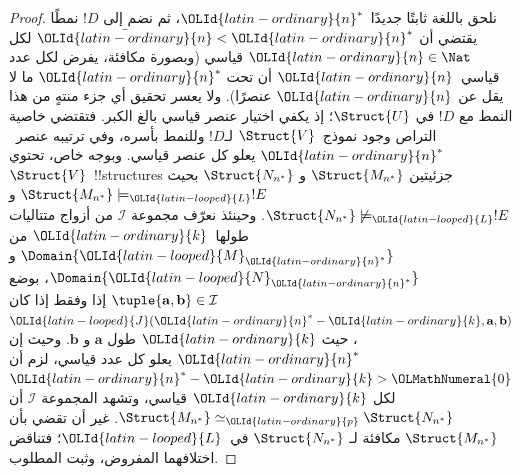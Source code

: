 \documentclass[../../../include/open-logic-section]{subfiles}
\begin{document}
\begin{proof}
نلحق باللغة ثابتًا جديدًا~${\OLId{latin-ordinary}{n}}^*$، ثم نضم إلى $!D$ نمطًا يقتضي أن
$\bar {\OLId{latin-ordinary}{n}} < {\OLId{latin-ordinary}{n}}^*$ لكل ${\OLId{latin-ordinary}{n}} \in \Nat$ قياسي (وبصورة مكافئة، يفرض لكل عدد
قياسي~${\OLId{latin-ordinary}{n}}$ أن تحت ${\OLId{latin-ordinary}{n}}^*$ ما لا يقل عن ${\OLId{latin-ordinary}{n}}$ عنصرًا). ولا يعسر تحقيق أي جزء منتهٍ من هذا
النمط مع $!D$ في $\Struct{U}$؛ إذ يكفي اختيار عنصر قياسي بالغ الكبر.
فتقتضي خاصية التراص وجود نموذج~$\Struct{V}$ لـ$!D$ وللنمط بأسره، وفي
ترتيبه عنصر~${\OLId{latin-ordinary}{n}}^*$ يعلو كل عنصر قياسي. وبوجه خاص، تحتوي
$\Struct{V}$~!!{structure}s جزئيتين $\Struct{M_{n^*}}$ و
$\Struct{N_{n^*}}$ بحيث $\Struct{M_{n^*}} \models_{\OLId{latin-looped}{L}} !E$ و
$\Struct{N_{n^*}} \not\models_{\OLId{latin-looped}{L}} !E$. وحينئذ نعرّف مجموعة
$\mathcal{I}$ من أزواج متتاليات طولها~${\OLId{latin-ordinary}{k}}$ من $\Domain{{\OLId{latin-looped}{M}}_{{\OLId{latin-ordinary}{n}}^*}}$ و
$\Domain{{\OLId{latin-looped}{N}}_{{\OLId{latin-ordinary}{n}}^*}}$، بوضع
$\tuple{\mathbf{a},\mathbf{b}} \in \mathcal{I}$ إذا وفقط إذا كان
${\OLId{latin-looped}{J}}({\OLId{latin-ordinary}{n}}^*-{\OLId{latin-ordinary}{k}},\mathbf{a},\mathbf{b})$، حيث ${\OLId{latin-ordinary}{k}}$ طول $\mathbf{a}$ و
$\mathbf{b}$. وحيث إن ${\OLId{latin-ordinary}{n}}^*$ يعلو كل عدد قياسي، لزم أن
${\OLId{latin-ordinary}{n}}^*-{\OLId{latin-ordinary}{k}}>{\OLMathNumeral{0}}$ لكل ${\OLId{latin-ordinary}{k}}$ قياسي، وتشهد المجموعة $\mathcal{I}$ أن
$\Struct{M_{n^*}} \simeq_{\OLId{latin-ordinary}{p}} \Struct{N_{n^*}}$. غير أن
 تقضي بأن $\Struct{M_{n^*}}$ مكافئة لـ
$\Struct{N_{n^*}}$ في~${\OLId{latin-looped}{L}}$؛ فتناقض اختلافهما المفروض، وثبت المطلوب.
\end{proof}
\end{document}
